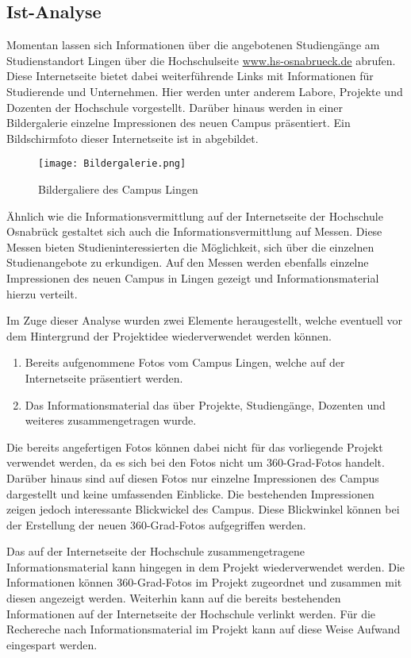\subsection{Ist-Analyse}
\label{sec:IstAnalyse}

Momentan lassen sich Informationen über die angebotenen Studiengänge am
Stu\-di\-en\-stand\-ort Lingen über die Hochschulseite
\url{www.hs-osnabrueck.de} abrufen. Diese Internetseite bietet dabei
weiterführende Links mit Informationen für Studierende und Unternehmen. Hier
werden unter anderem Labore, Projekte und Dozenten der Hochschule vorgestellt.
Darüber hinaus werden in einer Bildergalerie einzelne Impressionen des neuen
Campus präsentiert. Ein Bildschirmfoto dieser Internetseite ist in
 abgebildet.

\begin{figure}[htb]
\centering
\texttt{[image: Bildergalerie.png]}
\caption[Bildergalerie des Campus Lingen]{Bildergaliere des Campus Lingen\protect\footnotemark}
\label{fig:Bildergalerie}
\end{figure}

Ähnlich wie die Informationsvermittlung auf der Internetseite der Hochschule
Osnabrück gestaltet sich auch die Informationsvermittlung auf Messen. Diese
Messen bieten Studieninteressierten die Möglichkeit, sich über die einzelnen
Studienangebote zu erkundigen. Auf den Messen werden ebenfalls einzelne
Impressionen des neuen Campus in Lingen gezeigt und Informationsmaterial hierzu
verteilt.

Im Zuge dieser Analyse wurden zwei Elemente heraugestellt, welche eventuell vor
dem Hintergrund der Projektidee wiederverwendet werden können.

\begin{enumerate}
  \item Bereits aufgenommene Fotos vom Campus Lingen, welche auf der
  Internetseite präsentiert werden.
  \item Das Informationsmaterial das über Projekte, Studiengänge, Dozenten und
  weiteres zusammengetragen wurde.
\end{enumerate}

Die bereits angefertigen Fotos können dabei nicht für das vorliegende Projekt
verwendet werden, da es sich bei den Fotos nicht um 360-Grad-Fotos handelt.
Darüber hinaus sind auf diesen Fotos nur einzelne Impressionen des Campus
dargestellt und keine umfassenden Einblicke. Die bestehenden Impressionen
zeigen jedoch interessante Blickwickel des Campus. Diese Blickwinkel können bei
der Erstellung der neuen 360-Grad-Fotos aufgegriffen werden.

Das auf der Internetseite der Hochschule zusammengetragene Informationsmaterial
kann hingegen in dem Projekt wiederverwendet werden. Die Informationen können
360-Grad-Fotos im Projekt zugeordnet und zusammen mit diesen angezeigt werden.
Weiterhin kann auf die bereits bestehenden Informationen auf der Internetseite
der Hochschule verlinkt werden. Für die Rechereche nach Informationsmaterial im
Projekt kann auf diese Weise Aufwand eingespart werden.